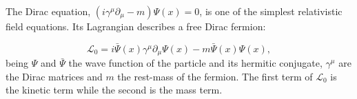 The Dirac equation, $(i \gamma^{\mu}\partial_{\mu} - m)\Psi(x)=0$, is one of the simplest relativistic field equations. Its Lagrangian
describes a free Dirac fermion:

\begin{equation}\label{eq:chap1:Dirac1}
\mathcal{L}_{0} = i \bar{\Psi}(x) \gamma^{\mu} \partial_{\mu} \Psi(x) - m \bar{\Psi}(x) \Psi(x) ,
\end{equation}
being $\Psi$ and $\bar{\Psi}$ the wave function of the particle and its hermitic conjugate, $\gamma^{\mu}$ 
are the Dirac matrices and $m$ the rest-mass of the fermion.
The first term of $\mathcal{L}_{0}$ is the kinetic term while the second is the mass term. 




